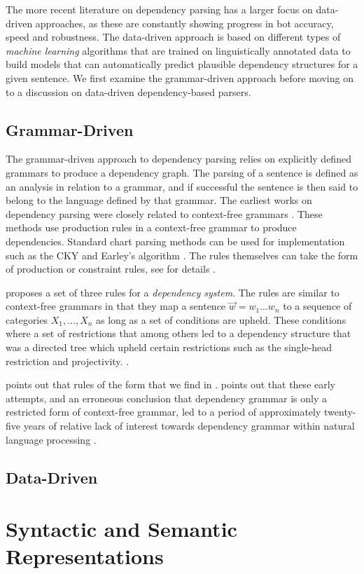 The more recent literature on dependency parsing has a larger focus on data-driven approaches, as these are constantly showing progress in bot accuracy, speed and robustness. The data-driven approach is based on different types of \textit{machine learning} algorithms that are trained on linguistically annotated data to build models that can automatically predict plausible dependency structures for a given sentence. We first examine the grammar-driven approach before moving on to a discussion on data-driven dependency-based parsers.

\subsection{Grammar-Driven}
\label{grammar-driven}

The grammar-driven approach to dependency parsing relies on explicitly defined grammars to produce a dependency graph. The parsing of a sentence is defined as an analysis in relation to a grammar, and if successful the sentence is then said to belong to the language defined by that grammar. The earliest works on dependency parsing were closely related to context-free grammars \cite{KublerEtAl:09}. These methods use production rules in a context-free grammar to produce dependencies. Standard chart parsing methods can be used for implementation such as the CKY \cite{Younger:67} and Earley's algorithm \cite{Early:70}. The rules themselves can take the form of production or constraint rules, see \citeauthor{KublerEtAl:09} for details \cite{KublerEtAl:09}. 

\citeauthor{Gaifman:65} proposes a set of three rules for a \textit{dependency system}. The rules are similar to context-free grammars in that they map a sentence $\vec{w} = w_1 ... w_n$ to a sequence of categories $X_1, ..., X_n$ as long as a set of conditions are upheld. These conditions where a set of restrictions that among others led to a dependency structure that was a directed tree which upheld certain restrictions such as the single-head restriction and projectivity. \cite{Gaifman:65}.

\citeauthor{Niv:05} points out that rules of the form that we find in . \citeauthor{Niv:05} points out that these early attempts, and an erroneous conclusion that dependency grammar is only a restricted form of context-free grammar, led to a period of approximately twenty-five years of relative lack of interest towards dependency grammar within natural language processing \cite{Niv:05}. 

\subsection{Data-Driven}
\label{data-driven}

\section{Syntactic and Semantic Representations}
\label{syntactic-semantic}

\subsection{}
\label{}